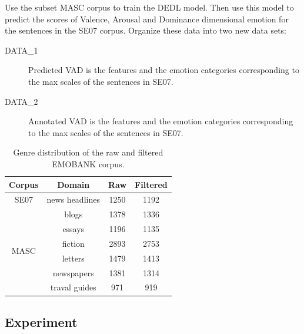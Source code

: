 Use the subset MASC corpus to train the DEDL model.
Then use this model to predict the scores of 
Valence, Arousal and Dominance dimensional emotion
for the sentences in the SE07 corpus.
Organize these data into two new data sets:

\begin{description}
	\item [DATA\_1] Predicted VAD is the features and 
	the emotion categories corresponding to 
	the max scales of the sentences in SE07.
	\item [DATA\_2] Annotated VAD is the features and 
	the emotion categories corresponding to 
	the max scales of the sentences in SE07.
\end{description}

\begin{table}[htbp]  \centering
	\caption{Genre distribution of the raw and filtered
		EMOBANK corpus.}
	\label{tbl:emobank}
	\begin{tabular}{cccc}
		\toprule
		Corpus & Domain  & Raw & Filtered  \\
		\midrule
		SE07 &  news headlines &  1250 &  1192 \\
		\hline
		\multirow{6}{*}{MASC} &  blogs&  1378&  1336\\
		&  essays &  1196 &  1135 \\
		&  fiction &  2893 &  2753 \\
		&  letters &  1479 &  1413 \\
		& newspapers & 1381 & 1314 \\
		& traval guides & 971 & 919 \\
		\bottomrule
	\end{tabular}
\end{table}

\subsection{Experiment}

\

